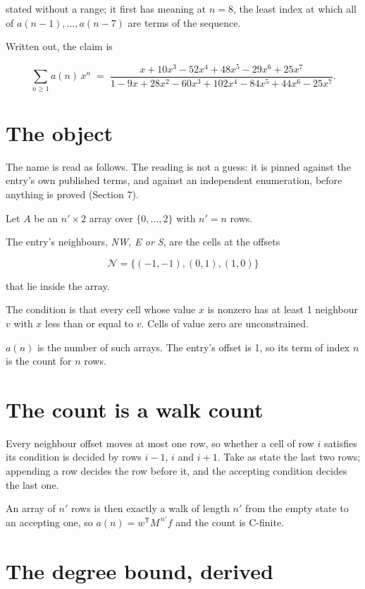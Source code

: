 \documentclass[11pt]{article}
\theoremstyle{definition}
\begin{document}
stated without a range; it first has meaning at $n = 8$, the least index at which all of $a(n-1),\dots,a(n-7)$ are terms of the sequence.

Written out, the claim is

\[\sum_{n \ge 1} a(n)\,x^n \;=\; \frac{x + 10x^{3} - 52x^{4} + 48x^{5} - 29x^{6} + 25x^{7}}{1 - 9x + 28x^{2} - 60x^{3} + 102x^{4} - 84x^{5} + 44x^{6} - 25x^{7}}.\]

\section{The object}

The name is read as follows. The reading is not a guess: it is pinned against the entry's own published terms, and against an independent enumeration, before anything is proved (Section 7).

Let $A$ be an $n' \times 2$ array over $\{0,\dots,2\}$ with $n' = n$ rows.

The entry's neighbours, {\itshape NW, E or S}, are the cells at the offsets

\[\mathcal{N} = \{(-1,-1), (0,1), (1,0)\}\]

that lie inside the array.

The condition is that every cell whose value $x$ is nonzero has at least 1 neighbour $v$ with $x$ less than or equal to $v$. Cells of value zero are unconstrained.

$a(n)$ is the number of such arrays. The entry's offset is 1, so its term of index $n$ is the count for $n$ rows.

\section{The count is a walk count}

Every neighbour offset moves at most one row, so whether a cell of row $i$ satisfies its condition is decided by rows $i-1$, $i$ and $i+1$. Take as state the last two rows; appending a row decides the row before it, and the accepting condition decides the last one.

An array of $n'$ rows is then exactly a walk of length $n'$ from the empty state to an accepting one, so $a(n) = w^{\mathsf T}M^{\,n'}f$ and the count is C-finite.

\section{The degree bound, derived}
\end{document}
